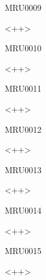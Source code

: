 \documentclass{article}
\begin{document}
\begin{corrige}{MRU0009}

<++>

\end{corrige}%


\begin{corrige}{MRU0010}

<++>

\end{corrige}%


\begin{corrige}{MRU0011}

<++>

\end{corrige}%


\begin{corrige}{MRU0012}

<++>

\end{corrige}%


\begin{corrige}{MRU0013}

<++>

\end{corrige}%


\begin{corrige}{MRU0014}

<++>

\end{corrige}%


\begin{corrige}{MRU0015}

<++>

\end{corrige}%
\end{document}
